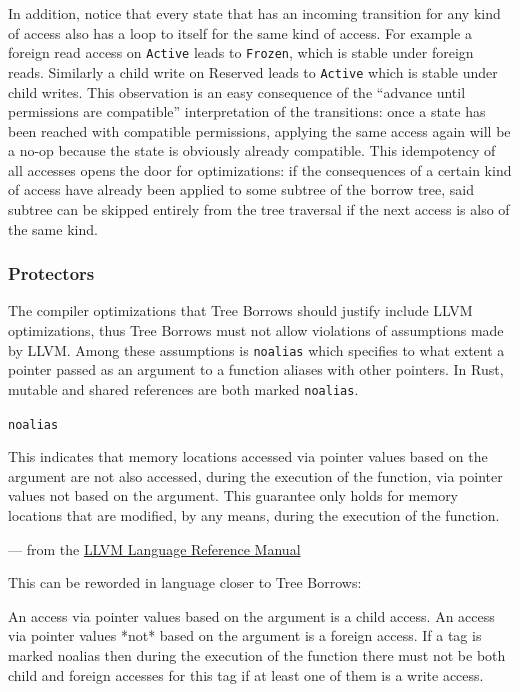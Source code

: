 \documentclass[a4paper,11pt]{article}
\theoremstyle{plain}
\theoremstyle{definition}
\theoremstyle{remark}
\newcommand{\tcode}[1]{\texttt{#1}}
\newcommand{\tperm}[1]{\texttt{#1}}
\begin{document}
In addition, notice that every state that has an incoming transition for any kind of
access also has a loop to itself for the same kind of access. For example a foreign read
access on \tperm{Active} leads to \tperm{Frozen}, which is stable under foreign reads. Similarly
a child write on Reserved leads to \tperm{Active} which is stable under child writes.
This observation is an easy consequence of the ``advance until permissions are compatible''
interpretation of the transitions: once a state has been reached with compatible
permissions, applying the same access again will be a no-op because the state
is obviously already compatible. This idempotency of all accesses opens the door
for optimizations: if the consequences of a certain kind of access have already
been applied to some subtree of the borrow tree, said subtree can be skipped entirely
from the tree traversal if the next access is also of the same kind.


\subsubsection{Protectors}

The compiler optimizations that Tree Borrows should justify include LLVM optimizations,
thus Tree Borrows must not allow violations of assumptions made by LLVM. Among these
assumptions is \tcode{noalias} which specifies to what extent a pointer passed as an
argument to a function aliases with other pointers. In Rust, mutable and shared
references are both marked \tcode{noalias}.

\begin{indent}
    \tcode{noalias}

    \begin{indent}
        This indicates that memory locations accessed via pointer values based on the argument
        are not also accessed, during the execution of the function, via pointer values not based on
        the argument. This guarantee only holds for memory locations that are modified,
        by any means, during the execution of the function.
    \end{indent}

    --- from the \href{https://llvm.org/docs/LangRef.html}{LLVM Language Reference Manual}
\end{indent}

This can be reworded in language closer to Tree Borrows:

\begin{indent}
An access via pointer values based on the argument is a child access.
An access via pointer values *not* based on the argument is a foreign access.
If a tag is marked noalias then during the execution of the function there must
not be both child and foreign accesses for this tag if at least one of them is a write access.
\end{indent}
\end{document}

